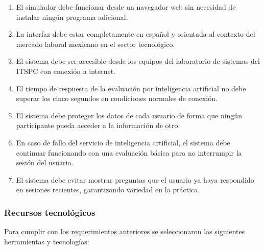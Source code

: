 \begin{enumerate}
    \item El simulador debe funcionar desde un navegador web sin
    necesidad de instalar ningún programa adicional.

    \item La interfaz debe estar completamente en español y orientada
    al contexto del mercado laboral mexicano en el sector tecnológico.

    \item El sistema debe ser accesible desde los equipos del
    laboratorio de sistemas del ITSPC con conexión a internet.

    \item El tiempo de respuesta de la evaluación por inteligencia
    artificial no debe superar los cinco segundos en condiciones
    normales de conexión.

    \item El sistema debe proteger los datos de cada usuario de forma
    que ningún participante pueda acceder a la información de otro.

    \item En caso de fallo del servicio de inteligencia artificial,
    el sistema debe continuar funcionando con una evaluación básica
    para no interrumpir la sesión del usuario.

    \item El sistema debe evitar mostrar preguntas que el usuario
    ya haya respondido en sesiones recientes, garantizando variedad
    en la práctica.
\end{enumerate}

\subsubsection{Recursos tecnológicos}

Para cumplir con los requerimientos anteriores se seleccionaron las
siguientes herramientas y tecnologías:

